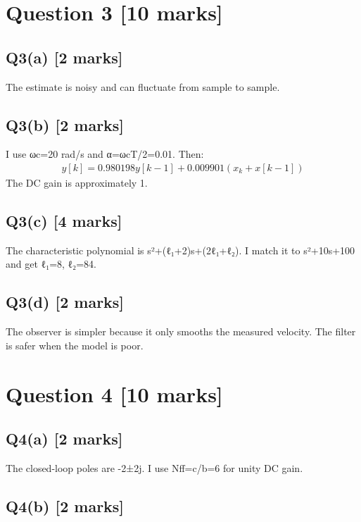 \documentclass[11pt,a4paper]{article}
\begin{document}
\section*{Question 3 \hfill [10 marks]}
\subsection*{Q3(a) \hfill [2 marks]}

The estimate is noisy and can fluctuate from sample to sample.

\subsection*{Q3(b) \hfill [2 marks]}

I use ωc=20 rad/s and α=ωcT/2=0.01.
Then:\[\begin{aligned}y[k] = 0.980198y[k-1] + 0.009901(x_k+x[k-1])\end{aligned}\]
The DC gain is approximately 1.

\subsection*{Q3(c) \hfill [4 marks]}

The characteristic polynomial is s²+(ℓ₁+2)s+(2ℓ₁+ℓ₂).
I match it to s²+10s+100 and get ℓ₁=8, ℓ₂=84.

\subsection*{Q3(d) \hfill [2 marks]}

The observer is simpler because it only smooths the measured velocity.
The filter is safer when the model is poor.

\section*{Question 4 \hfill [10 marks]}
\subsection*{Q4(a) \hfill [2 marks]}

The closed-loop poles are -2±2j.
I use Nff=c/b=6 for unity DC gain.

\subsection*{Q4(b) \hfill [2 marks]}
\end{document}
